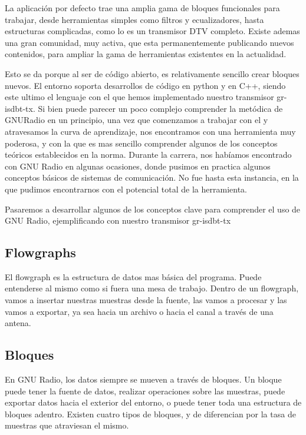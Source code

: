 La aplicación por defecto trae una amplia gama de bloques funcionales para trabajar, desde herramientas simples como filtros y ecualizadores, hasta estructuras complicadas, como lo es un transmisor DTV completo.  Existe ademas una gran comunidad, muy activa, que esta permanentemente publicando nuevos contenidos, para ampliar la gama de herramientas existentes en la actualidad. 

Esto se da porque al ser de código abierto, es relativamente sencillo crear bloques nuevos. El entorno soporta desarrollos de código en python y en C++, siendo este ultimo el lenguaje con el que hemos implementado nuestro transmisor gr-isdbt-tx. Si bien puede parecer un poco complejo comprender la metódica de GNURadio en un principio,  una vez que comenzamos a trabajar con el y atravesamos la curva de aprendizaje, nos encontramos con una herramienta muy poderosa, y con la que es mas sencillo comprender algunos de los conceptos teóricos establecidos en la norma.
Durante la carrera, nos habíamos encontrado con GNU Radio en algunas ocasiones, donde pusimos en practica algunos conceptos básicos de sistemas de comunicación. No fue hasta esta instancia, en la que pudimos encontrarnos con el potencial total de la herramienta. 

Pasaremos a desarrollar algunos de los conceptos clave para comprender el uso de GNU Radio, ejemplificando con nuestro transmisor gr-isdbt-tx

\subsection{Flowgraphs}

El flowgraph es la estructura de datos mas básica del programa. Puede entenderse al mismo como si fuera una mesa de trabajo. Dentro de un flowgraph, vamos a insertar nuestras muestras desde la fuente, las vamos a procesar y las vamos a exportar, ya sea hacia un archivo o hacia el canal a través de una antena. 

\subsection{Bloques}

En GNU Radio, los datos siempre se mueven a través de bloques. Un bloque puede tener la fuente de datos, realizar operaciones sobre las muestras, puede exportar datos hacia el exterior del entorno, o puede tener toda una estructura de bloques adentro. 
Existen cuatro tipos de bloques, y de diferencian por la tasa de muestras que atraviesan el mismo. 

